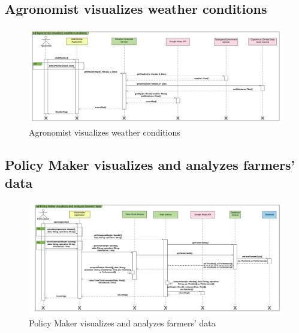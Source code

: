 \subsection{Agronomist visualizes weather conditions}

\newpage
\begin{landscape}
\begin{figure}[h]
\vspace*{-2cm}
\noindent
\centering
\centerline{\includegraphics[scale= 0.108]{./Images/Sequence diagram/Agronomist visualizes weather conditions.png}}
    \caption{Agronomist visualizes weather conditions}
    \vspace*{-12cm}
\end{figure}
\fillandplacepagenumber
\end{landscape}

\subsection{Policy Maker visualizes and analyzes farmers' data}

\newpage
\begin{landscape}
\begin{figure}[h]
\vspace*{-2cm}
\noindent
\centering
\centerline{\includegraphics[scale= 0.108]{./Images/Sequence diagram/Policy Maker visualizes and analyzes farmers' data.png}}
    \caption{Policy Maker visualizes and analyzes farmers' data}
    \vspace*{-12cm}
\end{figure}
\fillandplacepagenumber
\end{landscape}

